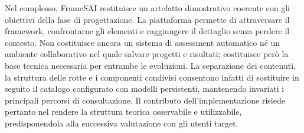 Nel complesso, FrameSAI restituisce un artefatto dimostrativo coerente con gli obiettivi della fase di progettazione. La piattaforma permette di attraversare il framework, confrontarne gli elementi e raggiungere il dettaglio senza perdere il contesto. Non costituisce ancora un sistema di assessment automatico né un ambiente collaborativo nel quale salvare progetti e risultati; costituisce però la base tecnica necessaria per entrambe le evoluzioni. La separazione dei contenuti, la struttura delle rotte e i componenti condivisi consentono infatti di sostituire in seguito il catalogo configurato con modelli persistenti, mantenendo invariati i principali percorsi di consultazione. Il contributo dell'implementazione risiede pertanto nel rendere la struttura teorica osservabile e utilizzabile, predisponendola alla successiva valutazione con gli utenti target.
